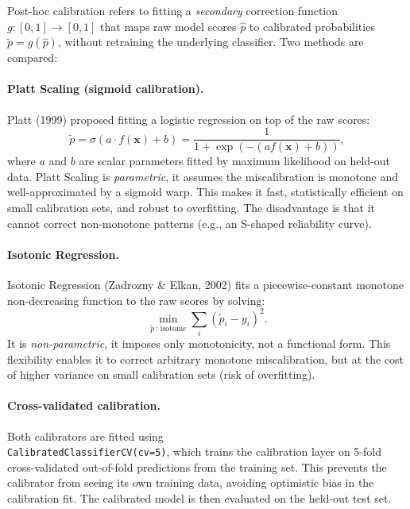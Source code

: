 \documentclass[12pt]{article}
\begin{document}
Post-hoc calibration refers to fitting a \emph{secondary} correction function
$g: [0,1] \to [0,1]$ that maps raw model scores $\hat{p}$ to calibrated
probabilities $\tilde{p} = g(\hat{p})$, without retraining the underlying
classifier.
Two methods are compared:

\paragraph{Platt Scaling (sigmoid calibration).}
Platt (1999) proposed fitting a logistic regression on top of the raw scores:
\begin{equation}
  \tilde{p} = \sigma(a \cdot f(\mathbf{x}) + b)
    = \frac{1}{1 + \exp(-(a f(\mathbf{x}) + b))},
\end{equation}
where $a$ and $b$ are scalar parameters fitted by maximum likelihood on
held-out data.
Platt Scaling is \emph{parametric}, it assumes the miscalibration is
monotone and well-approximated by a sigmoid warp.
This makes it fast, statistically efficient on small calibration sets, and
robust to overfitting.
The disadvantage is that it cannot correct non-monotone patterns (e.g., an
S-shaped reliability curve).

\paragraph{Isotonic Regression.}
Isotonic Regression (Zadrozny \& Elkan, 2002) fits a piecewise-constant
monotone non-decreasing function to the raw scores by solving:
\begin{equation}
  \min_{\tilde{p}\,:\,\text{isotonic}} \sum_i (\tilde{p}_i - y_i)^2.
\end{equation}
It is \emph{non-parametric}, it imposes only monotonicity, not a
functional form.
This flexibility enables it to correct arbitrary monotone miscalibration,
but at the cost of higher variance on small calibration sets (risk of overfitting).

\paragraph{Cross-validated calibration.}
Both calibrators are fitted using \\ \texttt{CalibratedClassifierCV(cv=5)},
which trains the calibration layer on 5-fold cross-validated out-of-fold
predictions from the training set.
This prevents the calibrator from seeing its own training data, avoiding
optimistic bias in the calibration fit.
The calibrated model is then evaluated on the held-out test set.
\end{document}
